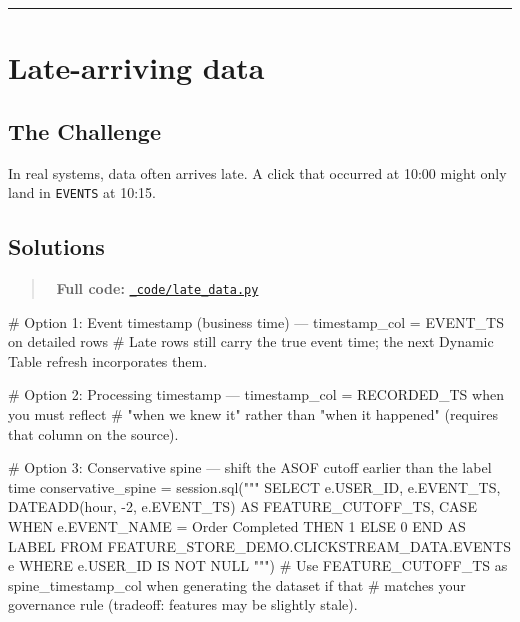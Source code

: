 \documentclass[
  letterpaper,
  DIV=11,
  numbers=noendperiod]{scrreprt}
\newenvironment{Shaded}{\begin{snugshade}}{\end{snugshade}}
\newcommand{\CommentTok}[1]{\textcolor[rgb]{0.37,0.37,0.37}{#1}}
\newcommand{\NormalTok}[1]{\textcolor[rgb]{0.00,0.23,0.31}{#1}}
\newcommand{\OperatorTok}[1]{\textcolor[rgb]{0.37,0.37,0.37}{#1}}
\newcommand{\StringTok}[1]{\textcolor[rgb]{0.13,0.47,0.30}{#1}}
\begin{document}
\begin{center}\rule{0.5\linewidth}{0.5pt}\end{center}

\hypertarget{late-arriving-data}{%
\section{Late-arriving data}\label{late-arriving-data}}

\hypertarget{the-challenge}{%
\subsection{The Challenge}\label{the-challenge}}

In real systems, data often arrives late. A click that occurred at 10:00
might only land in \texttt{EVENTS} at 10:15.

\hypertarget{solutions}{%
\subsection{Solutions}\label{solutions}}

\begin{quote}
📁 \textbf{Full code:}
\href{_code/late_data.py}{\texttt{\_code/late\_data.py}}
\end{quote}

\begin{Shaded}
\begin{Highlighting}[]
\CommentTok{\# Option 1: Event timestamp (business time) — timestamp\_col = EVENT\_TS on detailed rows}
\CommentTok{\# Late rows still carry the true event time; the next Dynamic Table refresh incorporates them.}

\CommentTok{\# Option 2: Processing timestamp — timestamp\_col = RECORDED\_TS when you must reflect}
\CommentTok{\# "when we knew it" rather than "when it happened" (requires that column on the source).}

\CommentTok{\# Option 3: Conservative spine — shift the ASOF cutoff earlier than the label time}
\NormalTok{conservative\_spine }\OperatorTok{=}\NormalTok{ session.sql(}\StringTok{"""}
\StringTok{    SELECT}
\StringTok{        e.USER\_ID,}
\StringTok{        e.EVENT\_TS,}
\StringTok{        DATEADD(\textquotesingle{}hour\textquotesingle{}, {-}2, e.EVENT\_TS) AS FEATURE\_CUTOFF\_TS,}
\StringTok{        CASE WHEN e.EVENT\_NAME = \textquotesingle{}Order Completed\textquotesingle{} THEN 1 ELSE 0 END AS LABEL}
\StringTok{    FROM FEATURE\_STORE\_DEMO.CLICKSTREAM\_DATA.EVENTS e}
\StringTok{    WHERE e.USER\_ID IS NOT NULL}
\StringTok{"""}\NormalTok{)}
\CommentTok{\# Use FEATURE\_CUTOFF\_TS as spine\_timestamp\_col when generating the dataset if that}
\CommentTok{\# matches your governance rule (tradeoff: features may be slightly stale).}
\end{Highlighting}
\end{Shaded}
\end{document}
